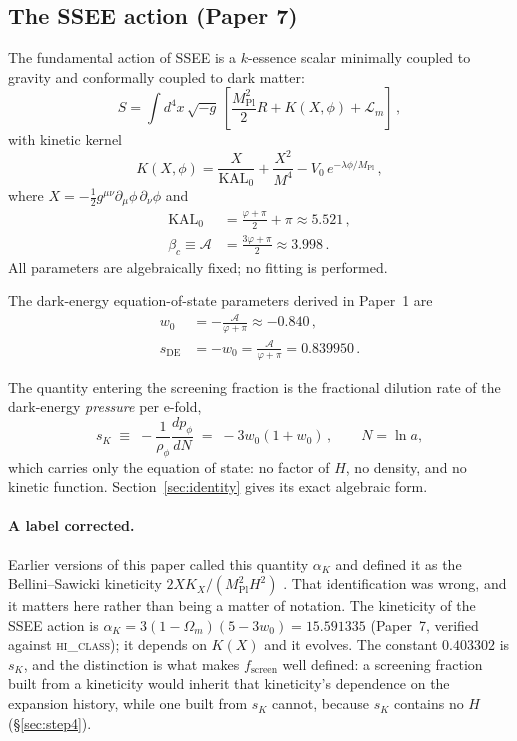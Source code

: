 \documentclass[12pt,a4paper]{article}
\newcommand{\phiG}{\varphi}
\newcommand{\KAL}{\mathrm{KAL}_0}
\newcommand{\AURA}{\mathcal{A}}
\newcommand{\Mpl}{M_{\mathrm{Pl}}}
\newcommand{\bc}{\beta_c}
\newcommand{\fsc}{f_{\mathrm{screen}}}
\newcommand{\sK}{s_K}          %
\newcommand{\sDE}{s_{\mathrm{DE}}} %
\newcommand{\alphaK}{\alpha_K}     %
\renewcommand{\Omega}{\varOmega}
\begin{document}
\subsection{The SSEE action (Paper 7)}
\label{sec:p7recap}

The fundamental action of SSEE is a $k$-essence scalar
\citep{ArmendarizPicon1999,ArmendarizPicon2001} minimally
coupled to gravity and conformally coupled to dark matter:
\begin{equation}
  S = \int d^4x\,\sqrt{-g}\,\left[
      \frac{\Mpl^2}{2}R + K(X,\phi) + \mathcal{L}_m
      \right]\,,
  \label{eq:action}
\end{equation}
with kinetic kernel
\begin{equation}
  K(X,\phi) = \frac{X}{\KAL} + \frac{X^2}{M^4} - V_0\,e^{-\lambda\phi/\Mpl}\,,
  \label{eq:Kkernel}
\end{equation}
where $X = -\tfrac{1}{2}g^{\mu\nu}\partial_\mu\phi\,\partial_\nu\phi$ and
\begin{align}
  \KAL   &= \frac{\phiG+\pi}{2}+\pi \approx 5.521\,, \label{eq:KAL}\\
  \bc \equiv \AURA &= \frac{3\phiG+\pi}{2} \approx 3.998\,. \label{eq:bc}
\end{align}
All parameters are algebraically fixed; no fitting is performed.

The dark-energy equation-of-state parameters derived in Paper~1 are
\begin{align}
  w_0 &= -\frac{\AURA}{\phiG+\pi} \approx -0.840\,, \label{eq:w0}\\
  \sDE &= -w_0 = \frac{\AURA}{\phiG+\pi} = 0.839950\,. \label{eq:sDE}
\end{align}

The quantity entering the screening fraction is the fractional dilution rate
of the dark-energy \emph{pressure} per e-fold,
\begin{equation}
  \sK \;\equiv\; -\frac{1}{\rho_\phi}\frac{dp_\phi}{dN}
      \;=\; -3w_0(1+w_0)\,, \qquad N = \ln a,
  \label{eq:sK_def}
\end{equation}
which carries only the equation of state: no factor of $H$, no density, and
no kinetic function.  Section~\ref{sec:identity} gives its exact algebraic
form.

\paragraph{A label corrected.}
Earlier versions of this paper called this quantity $\alphaK$ and defined it
as the Bellini--Sawicki kineticity $2XK_X/(\Mpl^2H^2)$
\citep{Bellini2015,Gubitosi2013,Gleyzes2013}.  That identification was wrong,
and it matters here rather than being a matter of notation.  The kineticity of
the SSEE action is $\alphaK = 3(1-\Omega_m)(5-3w_0) = 15.591335$ (Paper~7,
verified against \textsc{hi\_class}); it depends on $K(X)$ and it evolves.
The constant $0.403302$ is $\sK$, and the distinction is what makes
$\fsc$ well defined: a screening fraction built from a kineticity would
inherit that kineticity's dependence on the expansion history, while one built
from $\sK$ cannot, because $\sK$ contains no $H$ (§\ref{sec:step4}).
\end{document}
